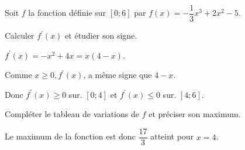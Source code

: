 \documentclass[11pt,a4paper]{article}  %
\begin{document}
Soit $f$ la fonction définie sur $[0 ; 6]$ par $f(x)=-\dfrac{1}{3} x^3+2 x^2-5$.
\begin{enumMet}
	\item Calculer $f^{\prime}(x)$ et étudier son signe.
	\begin{corrBox}
		$f^{\prime}(x)=-x^2+4 x=x(4-x)$. 
		
		Comme $x \geqslant 0, f^{\prime}(x)$, a même signe que $4-x$.
		
		
		Donc $f^{\prime}(x) \geqslant 0$ sur. $[0 ; 4]$ et $f^{\prime}(x) \leqslant 0$ sur. $[4 ; 6]$.		
	\end{corrBox}
	\item Compléter le tableau de variations de $f$ et préciser son maximum.
	\begin{corrBox}
		
		Le maximum de la fonction est donc $\dfrac{17}{3}$ atteint pour $x=4$.	
	\end{corrBox}
\end{enumMet}

\newpage


\end{document}
